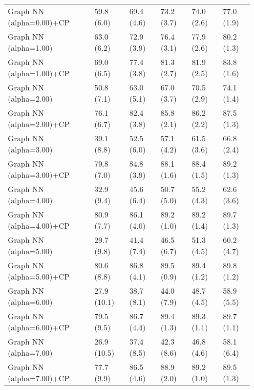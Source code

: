 \documentclass{article}
\begin{document}
\begin{table*}[t!]
\begin{center}
\begin{small}
\begin{sc}
\begin{tabular}{llllll}
Graph NN (alpha=0.00)+CP&59.8 (6.0)      &69.4 (4.6)      &73.2 (3.7)      &74.0 (2.6)      &77.0 (1.9)      \\
Graph NN (alpha=1.00)&63.0 (6.2)      &72.9 (3.9)      &76.4 (3.1)      &77.9 (2.6)      &80.2 (1.3)      \\
Graph NN (alpha=1.00)+CP&69.0 (6.5)      &77.4 (3.8)      &81.3 (2.7)      &81.9 (2.5)      &83.8 (1.6)      \\
Graph NN (alpha=2.00)&50.8 (7.1)      &63.0 (5.1)      &67.0 (3.7)      &70.5 (2.9)      &74.1 (1.4)      \\
Graph NN (alpha=2.00)+CP&76.1 (6.7)      &82.4 (3.8)      &85.8 (2.1)      &86.2 (2.2)      &87.5 (1.3)      \\
Graph NN (alpha=3.00)&39.1 (8.8)      &52.5 (6.0)      &57.1 (4.2)      &61.5 (3.6)      &66.8 (2.4)      \\
Graph NN (alpha=3.00)+CP&79.8 (7.0)      &84.8 (3.9)      &88.1 (1.6)      &88.4 (1.5)      &89.2 (1.3)      \\
Graph NN (alpha=4.00)&32.9 (9.4)      &45.6 (6.4)      &50.7 (5.0)      &55.2 (4.3)      &62.6 (3.6)      \\
Graph NN (alpha=4.00)+CP&80.9 (7.7)      &86.1 (4.0)      &89.2 (1.0)      &89.2 (1.4)      &89.7 (1.3)      \\
Graph NN (alpha=5.00)&29.7 (9.8)      &41.4 (7.4)      &46.5 (6.7)      &51.3 (4.5)      &60.2 (4.7)      \\
Graph NN (alpha=5.00)+CP&80.6 (8.8)      &86.8 (4.1)      &89.5 (0.9)      &89.4 (1.2)      &89.8 (1.2)      \\
Graph NN (alpha=6.00)&27.9 (10.1)      &38.7 (8.1)      &44.0 (7.9)      &48.7 (4.5)      &58.9 (5.5)      \\
Graph NN (alpha=6.00)+CP&79.5 (9.5)      &86.7 (4.4)      &89.4 (1.3)      &89.3 (1.1)      &89.7 (1.1)      \\
Graph NN (alpha=7.00)&26.9 (10.5)      &37.4 (8.5)      &42.3 (8.6)      &46.8 (4.6)      &58.1 (6.4)      \\
Graph NN (alpha=7.00)+CP&77.7 (9.9)      &86.5 (4.6)      &88.9 (2.0)      &89.2 (1.0)      &89.5 (1.3)      \\
\bottomrule
\end{tabular}
\end{sc}
\end{small}
\end{center}
\vskip -0.1in
\end{table*}
\end{document}
